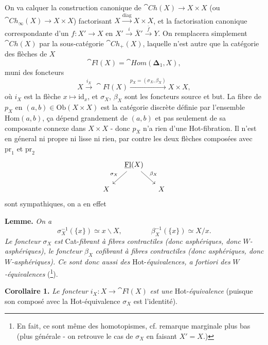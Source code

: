 On va calquer la construction canonique de $\cat{Ch}(X) \longrightarrow X \times X$ (ou $\cat{Ch}_\infty(X) \longrightarrow X \times X$) factorisant $X \xrightarrow{\mathrm{diag}} X \times X$, et la factorisation canonique correspondante d'un $f : X' \longrightarrow X$ en $X' \xrightarrow{i} \bar{X}' \xrightarrow{\bar{f}} Y$. On remplacera simplement $\cat{Ch}(X)$ par la sous-catégorie $\cat{Ch}_+(X)$, laquelle n'est autre que la catégorie des flèches de $X$
\[
\cat{Fl}(X) = \cat{Hom}(\boldsymbol{\Delta}_1, X),
\]
muni des foncteurs
\[
X \xrightarrow{i_X} \cat{Fl}(X) \xrightarrow{p_X=(\sigma_X,\beta_X)} X \times X,
\]
où $i_X$ est la flèche $x \longmapsto \mathrm{id}_x$, et $\sigma_X$, $\beta_X$ sont les foncteurs source et but. La fibre de $p_X$ en $(a,b) \in \mathrm{Ob}(X \times X)$ est la catégorie discrète définie par l'ensemble $\mathrm{Hom}(a,b)$, ça dépend grandement de $(a,b)$ et pas seulement de sa composante connexe dans $X \times X$ - donc $p_X$ n'a rien d'une Hot-fibration. Il n'est en géneral ni propre ni lisse ni rien, par contre les deux flèches composées avec $\mathrm{pr}_1$ et $\mathrm{pr}_2$ %
\[
\begin{tikzcd}[column sep=small]
& \cat{Fl}(X) \arrow[ld, "\sigma_X"'] \arrow[rd, "\beta_X"] & \\
X & & X
\end{tikzcd}
\]
sont sympathiques, on a en effet

\textbf{Lemme.} \textit{On a}
\[
\sigma_X^{-1}(\{x\}) \simeq x\backslash X, \qquad\qquad \beta_X^{-1}(\{x\}) \simeq X/x.
\]
\textit{Le foncteur} $\sigma_X$ \textit{est} Cat-\textit{fibrant à fibres contractiles (donc asphériques, donc} $W$\textit{-asphériques), le foncteur} $\beta_X$ \textit{cofibrant à fibres contractiles (donc asphériques, donc} $W$\textit{-asphériques). Ce sont donc aussi des} Hot-\textit{équivalences, a fortiori des} $W$\textit{-équivalences} (\footnote[8]{En fait, ce sont même des homotopismes, cf. remarque marginale plus bas (plus générale - on retrouve le cas de $\sigma_X$ en faisant $X' = X$.)}).

\textbf{Corollaire 1.} \textit{Le foncteur} $i_X : X \longrightarrow \cat{Fl}(X)$ \textit{est une} Hot-\textit{équivalence} (puisque son composé avec la Hot-équivalence $\sigma_X$ est l'identité).

